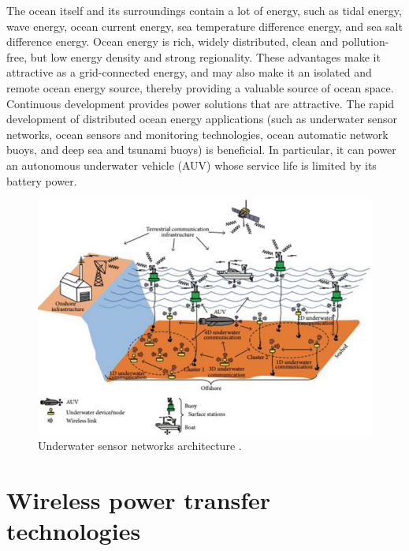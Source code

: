 The ocean itself and its surroundings contain a lot of energy, such as tidal energy, wave energy, ocean current energy, sea temperature difference energy, and sea salt difference energy. Ocean energy is rich, widely distributed, clean and pollution-free, but low energy density and strong regionality. These advantages make it attractive as a grid-connected energy, and may also make it an isolated and remote ocean energy source, thereby providing a valuable source of ocean space. Continuous development provides power solutions that are attractive. The rapid development of distributed ocean energy applications (such as underwater sensor networks, ocean sensors and monitoring technologies, ocean automatic network buoys, and deep sea and tsunami buoys) is beneficial. In particular, it can power an autonomous underwater vehicle (AUV) whose service life is limited by its battery power.

\begin{figure}[htbp]
    \centering
    \includegraphics[width=0.9\linewidth]{images/1_underwater_sensor_networks.png}
    \caption{Underwater sensor networks architecture \cite{Nayyar}.}
\end{figure}



\section{Wireless power transfer technologies}

